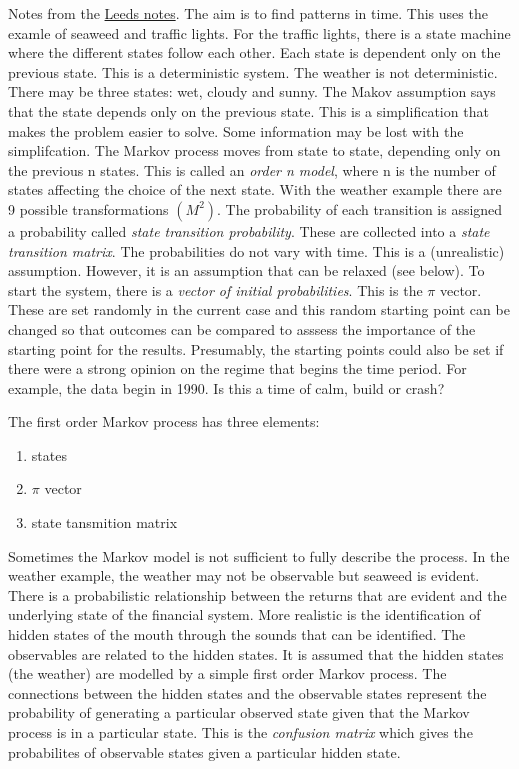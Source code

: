 \documentclass[12pt, a4paper, oneside]{article} %
\begin{document}
Notes from the \href{http://www.comp.leeds.ac.uk/roger/HiddenMarkovModels/html_dev/main.html}{Leeds notes}.  The aim is to find patterns in time. This uses the examle of seaweed and traffic lights.  For the traffic lights, there is a state machine where the different states follow each other. Each state is dependent only on the previous state. This is a deterministic system. The weather is not deterministic.  There may be three states:  wet, cloudy and sunny. The Makov assumption says that the state depends only on the previous state. This is a simplification that makes the problem easier to solve.  Some information may be lost with the simplifcation. The Markov process moves from state to state, depending only on the previous n states.  This is called an \emph{order n model}, where n is the number of states affecting the choice of the next state. With the weather example there are 9 possible transformations $(M^2)$.  The probability of each transition is assigned  a probability called \emph{state transition probability}.  These are collected into a \emph{state transition matrix}. The probabilities do not vary with time.  This is a (unrealistic) assumption. However, it is an assumption that can be relaxed (see below).  To start the system, there is a \emph{vector of initial probabilities}.  This is the $\pi$ vector.  These are set randomly in the current case and this random starting point can be changed so that outcomes can be compared to asssess the importance of the starting point for the results. Presumably, the starting points could also be set if there were a strong opinion on the regime that begins the time period. For example, the data begin in 1990.  Is this a time  of calm, build or crash? 

The first order Markov process has three elements: 
\begin{enumerate}
\item states
\item $\pi$ vector
\item state tansmition matrix
\end{enumerate}
 Sometimes the Markov model is not sufficient to fully describe the process.  In the weather example, the weather may not be observable but seaweed is evident.  There is a probabilistic relationship between the returns that are evident and the underlying state of the financial system.  More realistic is the identification of hidden states of the mouth through the sounds that can be identified.  The observables are related to the hidden states. It is assumed that the hidden states (the weather) are modelled by a simple first order Markov process.  The connections between the hidden states and the observable states represent the probability of generating a particular observed state given that the Markov process is in a particular state.  This is the \emph{confusion matrix} which gives the probabilites of observable states given a particular hidden state. 
 
\end{document}
